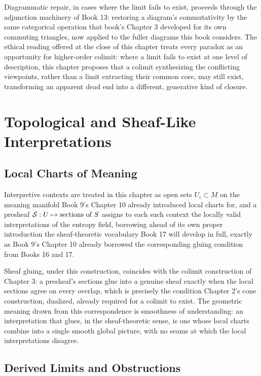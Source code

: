 Diagrammatic repair, in cases where the limit fails to exist, proceeds through the adjunction machinery of Book 13: restoring a diagram's commutativity by the same categorical operation that book's Chapter 3 developed for its own commuting triangles, now applied to the fuller diagrams this book considers. The ethical reading offered at the close of this chapter treats every paradox as an opportunity for higher-order colimit: where a limit fails to exist at one level of description, this chapter proposes that a colimit synthesizing the conflicting viewpoints, rather than a limit extracting their common core, may still exist, transforming an apparent dead end into a different, generative kind of closure.

\part{Topological and Sheaf-Like Interpretations}

\chapter{Local Charts of Meaning}

Interpretive contexts are treated in this chapter as open sets $U_i \subset M$ on the meaning manifold Book 9's Chapter 10 already introduced local charts for, and a presheaf $\mathcal{S}: U \mapsto \text{sections of } S$ assigns to each such context the locally valid interpretations of the entropy field, borrowing ahead of its own proper introduction the sheaf-theoretic vocabulary Book 17 will develop in full, exactly as Book 9's Chapter 10 already borrowed the corresponding gluing condition from Books 16 and 17.

Sheaf gluing, under this construction, coincides with the colimit construction of Chapter 3: a presheaf's sections glue into a genuine sheaf exactly when the local sections agree on every overlap, which is precisely the condition Chapter 2's cone construction, dualized, already required for a colimit to exist. The geometric meaning drawn from this correspondence is smoothness of understanding: an interpretation that glues, in the sheaf-theoretic sense, is one whose local charts combine into a single smooth global picture, with no seams at which the local interpretations disagree.

\chapter{Derived Limits and Obstructions}

